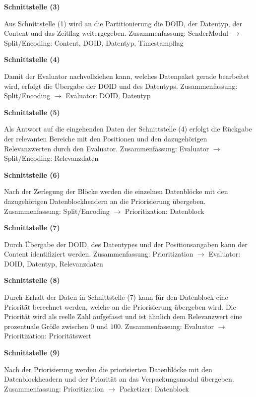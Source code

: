 \textbf{Schnittstelle (3)}

Aus Schnittstelle (1) wird an die Partitionierung
die \gls{DOID}, der Datentyp, der Content und das Zeitflag
weitergegeben.\newline
Zusammenfassung: SenderModul $\rightarrow$ Split/Encoding: Content, \gls{DOID},
Datentyp, Timestampflag

\textbf{Schnittstelle (4)}

Damit der Evaluator nachvollziehen kann, welches Datenpaket gerade bearbeitet
wird, erfolgt die Übergabe der \gls{DOID} und des Datentyps. \newline
Zusammenfassung: Split/Encoding $\rightarrow$ Evaluator: \gls{DOID}, Datentyp

\textbf{Schnittstelle (5)}

Als Antwort auf die eingehenden Daten der Schnittstelle (4)
erfolgt die Rückgabe der relevanten Bereiche mit den Positionen und den
dazugehörigen Relevanzwerten durch den Evaluator. \newline
Zusammenfassung: Evaluator $\rightarrow$ Split/Encoding: Relevanzdaten   

\textbf{Schnittstelle (6)}

Nach der Zerlegung der Blöcke werden die einzelnen
Datenblöcke mit den dazugehörigen Datenblockheadern an die
Priorisierung übergeben. \newline
Zusammenfassung: Split/Encoding $\rightarrow$ Prioritization: Datenblock

\textbf{Schnittstelle (7)}

Durch Übergabe der \gls{DOID}, des Datentypes und der Positionsangaben kann der
Content identifiziert werden. \newline
Zusammenfassung: Prioritization $\rightarrow$ Evaluator: \gls{DOID}, Datentyp,
Relevanzdaten

\textbf{Schnittstelle (8)}

Durch Erhalt der Daten in Schnittstelle (7) kann für
den Datenblock eine Priorität berechnet werden, welche an die Priorisierung übergeben
wird. Die Priorität wird als reelle Zahl aufgefasst und ist ähnlich dem
Relevanzwert eine prozentuale Größe zwischen $0$ und $100$. \newline
Zusammenfassung: Evaluator $\rightarrow$ Prioritization: Prioritätswert

\textbf{Schnittstelle (9)}

Nach der Priorisierung werden die priorisierten Datenblöcke mit den
Datenblockheadern und der Priorität an das Verpackungsmodul übergeben. \newline
Zusammenfassung: Prioritization $\rightarrow$ Packetizer: Datenblock


